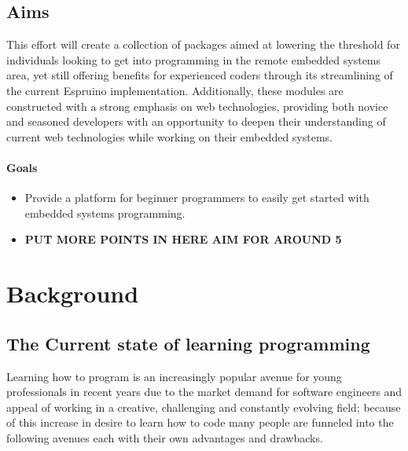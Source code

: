 \documentclass{l4proj}
\begin{document}
\section{Aims}

\text This effort will create a collection of packages aimed at lowering the threshold for individuals looking to get into programming in the remote embedded systems area, yet still offering benefits for experienced coders through its streamlining of the current Espruino implementation. Additionally, these modules are constructed with a strong emphasis on web technologies, providing both novice and seasoned developers with an opportunity to deepen their understanding of current web technologies while working on their embedded systems.
\subsubsection{Goals}
\begin{itemize}
    \item Provide a platform for beginner programmers to easily get started with embedded systems programming.
    \item \textbf{PUT MORE POINTS IN HERE AIM FOR AROUND 5}
\end{itemize}



\chapter{Background}

\section{The Current state of learning programming}

Learning how to program is an increasingly popular avenue for young professionals in recent years due to the market demand for software engineers and appeal of working in a creative, challenging and constantly evolving field; because of this increase in desire to learn how to code many people are funneled into the following avenues each with their own advantages and drawbacks.
\end{document}

